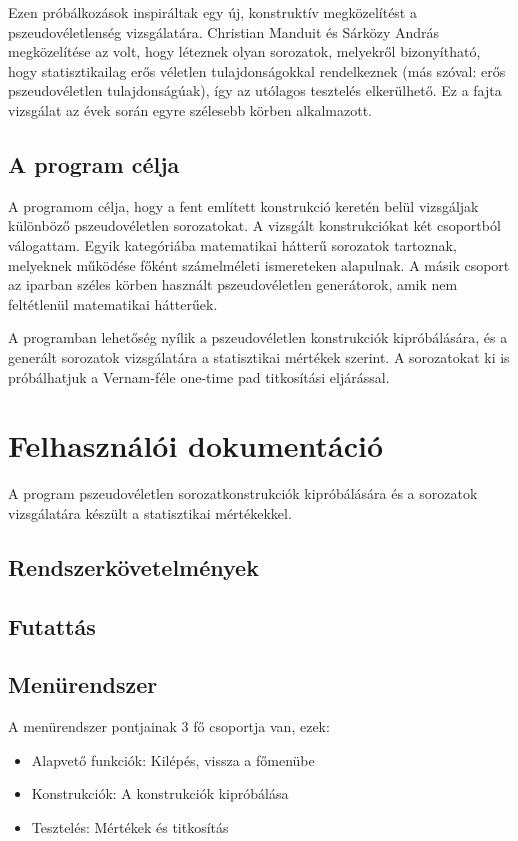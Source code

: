 \documentclass[12pt]{article}
\begin{document}
	\par
	Ezen próbálkozások inspiráltak egy új, konstruktív megközelítést a pszeudovéletlenség vizsgálatára. Christian Manduit és Sárközy András megközelítése az volt, hogy léteznek olyan sorozatok, melyekről bizonyítható, hogy statisztikailag erős véletlen tulajdonságokkal rendelkeznek (más szóval: erős pszeudovéletlen tulajdonságúak), így az utólagos tesztelés elkerülhető. Ez a fajta vizsgálat az évek során egyre szélesebb körben alkalmazott.
	\subsection{A program célja}
	A programom célja, hogy a fent említett konstrukció keretén belül vizsgáljak különböző pszeudovéletlen sorozatokat. A vizsgált konstrukciókat két csoportból válogattam. Egyik kategóriába matematikai hátterű sorozatok tartoznak, melyeknek működése főként számelméleti ismereteken alapulnak. A másik csoport az iparban széles körben használt pszeudovéletlen generátorok, amik nem feltétlenül matematikai hátterűek.
	\par
	A programban lehetőség nyílik a pszeudovéletlen konstrukciók kipróbálására, és a generált sorozatok vizsgálatára a statisztikai mértékek szerint. A sorozatokat ki is próbálhatjuk a Vernam-féle one-time pad titkosítási eljárással.
	\newpage
	\section{Felhasználói dokumentáció}
	A program pszeudovéletlen sorozatkonstrukciók kipróbálására és a sorozatok vizsgálatára készült a statisztikai mértékekkel.
	\subsection{Rendszerkövetelmények}
	\subsection{Futattás}
	\subsection{Menürendszer}
	A menürendszer pontjainak 3 fő csoportja van, ezek:
	\begin{itemize}
		\item Alapvető funkciók: Kilépés, vissza a főmenübe
		\item Konstrukciók: A konstrukciók kipróbálása
		\item Tesztelés: Mértékek és titkosítás
	\end{itemize}
\end{document}
